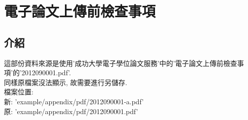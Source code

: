 \newpage
{}

\chapter{電子論文上傳前檢查事項}
\label{appendix:e-paper_upload}

\section{介紹}
這部份資料來源是使用'成功大學電子學位論文服務'中的'電子論文上傳前檢查事項'的'2012090001.pdf'.\\

同樣原檔案沒法顯示, 故需要進行另儲存.\\

檔案位置:\\
新: 'example/appendix/pdf/2012090001-a.pdf'\\
原: 'example/appendix/pdf/2012090001.pdf'\\



